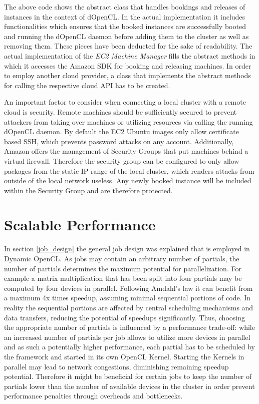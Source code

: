 The above code shows the abstract class that handles bookings and releases of instances in the context of dOpenCL. In the actual implementation it includes functionalities which ensures that the booked instances are successfully booted and running the dOpenCL daemon before adding them to the cluster as well as removing them. These pieces have been deducted for the sake of readability. The actual implementation of the \textit{EC2 Machine Manager} fills the abstract methods in which it accesses the Amazon SDK for booking and releasing machines. In order to employ another cloud provider, a class that implements the abstract methods for calling the respective cloud API has to be created.

An important factor to consider when connecting a local cluster with a remote cloud is security. Remote machines should be sufficiently secured to prevent attackers from taking over machines or utilizing resources via calling the running dOpenCL daemon. By default the EC2 Ubuntu images only allow certificate based SSH, which prevents password attacks on any account. Additionally, Amazon offers the management of Security Groups that put machines behind a virtual firewall. Therefore the security group can be configured to only allow packages from the static IP range of the local cluster, which renders attacks from outside of the local network useless. Any newly booked instance will be included within the Security Group and are therefore protected.

\section{Scalable Performance}
\label{scalable_performance}
In section \ref{job_design} the general job design was explained that is employed in Dynamic OpenCL. As jobs may contain an arbitrary number of partials, the number of partials determines the maximum potential for parallelization. For example a matrix multiplication that has been split into four partials may be computed by four devices in parallel. Following Amdahl's law it can benefit from a maximum 4x times speedup\cite{amdahl}, assuming minimal sequential portions of code. In reality the sequential portions are affected by central scheduling mechanisms and data transfers, reducing the potential of speedups significantly. Thus, choosing the appropriate number of partials is influenced by a performance trade-off: while an increased number of partials per job allows to utilize more devices in parallel and as such a potentially higher performance, each partial has to be scheduled by the framework and started in its own OpenCL Kernel. Starting the Kernels in parallel may lead to network congestions, diminishing remaining speedup potential. Therefore it might be beneficial for certain jobs to keep the number of partials lower than the number of available devices in the cluster in order prevent performance penalties through overheads and bottlenecks.

